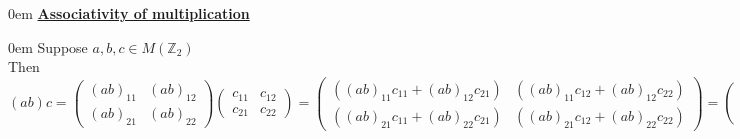 \documentclass{article} %
\begin{document}
\begin{addmargin}[1em]{0em}
\underline{\textbf{Associativity of multiplication}}
\begin{addmargin}[1em]{0em}
Suppose $a,b,c \in M(\mathbb{Z}_2)$
\\Then $(ab)c =  \left( \begin{smallmatrix} (ab)_{11} & (ab)_{12} \\ (ab)_{21} & (ab)_{22} \end{smallmatrix} \right) \left( \begin{smallmatrix} c_{11} & c_{12} \\ c_{21} & c_{22} \end{smallmatrix} \right) =
\left( \begin{smallmatrix} ((ab)_{11}c_{11} + (ab)_{12}c_{21}) & ((ab)_{11}c_{12} + (ab)_{12}c_{22}) \\ ((ab)_{21}c_{11} + (ab)_{22}c_{21}) & ((ab)_{21}c_{12} + (ab)_{22}c_{22}) \end{smallmatrix} \right) = 
\left( \begin{smallmatrix} ((a_{11}b_{11} + a_{12}b_{21})c_{11} + (a_{11}b_{12} + a_{12}b_{22})c_{21}) & ((a_{11}b_{11} + a_{12}b_{21})c_{12} +(a_{11}b_{12} + a_{12}b_{22})c_{22}) \\ ((a_{21}b_{11} + a_{22}b_{21})c_{11} + (a_{21}b_{12} + a_{22}b_{22})c_{21}) & ((a_{21}b_{11} + a_{22}b_{21})c_{12} +(a_{21}b_{12} + a_{22}b_{22})c_{22}) \end{smallmatrix} \right) = 
\left( \begin{smallmatrix} (a_{11}(b_{11}c_{11} + b_{12}c_{21}) + a_{12}(b_{21}c_{11} + b_{22}c_{21})) & (a_{11}(b_{11}c_{12} + b_{12}c_{22}) + a_{12}(b_{21}c_{12} + b_{22}c_{22})) \\ (a_{21}(b_{11}c_{11} + b_{12}c_{21}) + a_{22}(b_{21}c_{11} + b_{22}c_{21})) & (a_{21}(b_{11}c_{12} + b_{12}c_{22}) + a_{22}(b_{21}c_{12} + b_{22}c_{22})) \end{smallmatrix} \right) = 
\left( \begin{smallmatrix} (a_{11}(bc)_{11} + a_{12}(bc)_{21}) & (a_{11}(bc)_{12}+ a_{12}(bc)_{22}) \\ (a_{21}(bc)_{11} + a_{22}(bc)_{21}) & (a_{21}(bc)_{12} + a_{22}(bc)_{22}) \end{smallmatrix} \right) = 
\left( \begin{smallmatrix} a_{11} & a_{12} \\ a_{21} & a_{22} \end{smallmatrix} \right)  \left( \begin{smallmatrix} (bc)_{11} & (bc)_{12} \\ (bc)_{21} & (bc)_{22} \end{smallmatrix} \right) =
a(bc)$
\end{addmargin}


\end{addmargin}
\end{document}
